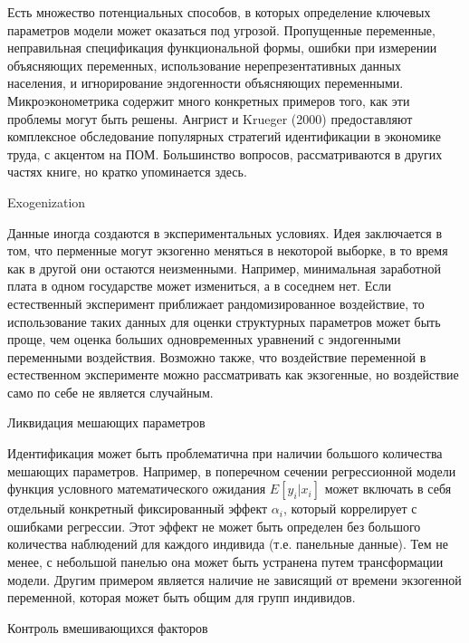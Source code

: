 Есть множество потенциальных способов, в которых определение ключевых параметров модели может оказаться под угрозой. Пропущенные переменные, неправильная спецификация функциональной формы, ошибки при измерении объясняющих переменных, использование нерепрезентативных данных населения, и игнорирование эндогенности объясняющих переменными. Микроэконометрика содержит много конкретных примеров того, как эти проблемы могут быть решены. Ангрист и Krueger (2000) предоставляют комплексное обследование популярных стратегий идентификации в экономике труда, с акцентом на ПОМ. Большинство вопросов, рассматриваются в других частях книге, но кратко упоминается здесь.


\begin{center}
Exogenization
\end{center}


Данные иногда создаются в экспериментальных условиях. Идея заключается в том, что перменные могут экзогенно меняться  в некоторой выборке, в то время как в другой они остаются неизменными. Например,  минимальная заработной плата в одном государстве может измениться, а в соседнем нет. Если естественный эксперимент приближает рандомизированное воздействие, то использование таких данных для оценки структурных параметров может быть проще, чем оценка больших одновременных уравнений с эндогенными переменными воздействия. Возможно также, что воздействие переменной в естественном эксперименте можно рассматривать как экзогенные, но воздействие само по себе не является случайным.


\begin{center}
Ликвидация мешающих параметров
\end{center}


Идентификация может быть проблематична при наличии большого количества мешающих параметров. Например, в поперечном сечении регрессионной модели функция условного математического ожидания $E[y_{i}|x_{i}]$ может включать в себя отдельный конкретный фиксированный эффект $\alpha_{i}$, который коррелирует с ошибками регрессии. Этот эффект не может быть определен без большого количества наблюдений для каждого индивида (т.е. панельные данные). Тем не менее, с небольшой панелью она может быть устранена путем трансформации модели. Другим примером является наличие не зависящий от времени экзогенной переменной, которая может быть общим для групп индивидов.


\begin{center}
Контроль вмешивающихся факторов
\end{center}


